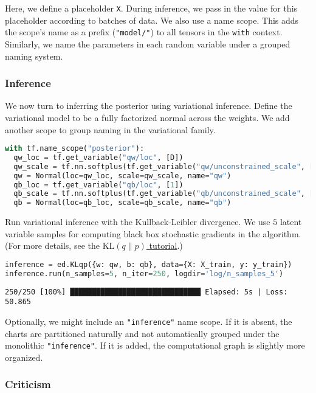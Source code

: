 Here, we define a placeholder \texttt{X}. During inference, we pass in
the value for this placeholder according to batches of data.  We also
use a name scope. This adds the scope's name as a prefix
(\texttt{"model/"}) to all tensors in the \texttt{with} context.
Similarly, we name the parameters in each random variable under a
grouped naming system.

\subsubsection{Inference}

We now turn to inferring the posterior using variational inference.
Define the variational model to be a fully factorized normal across
the weights. We add another scope to group naming in the variational
family.

\begin{lstlisting}[language=Python]
with tf.name_scope("posterior"):
  qw_loc = tf.get_variable("qw/loc", [D])
  qw_scale = tf.nn.softplus(tf.get_variable("qw/unconstrained_scale", [D]))
  qw = Normal(loc=qw_loc, scale=qw_scale, name="qw")
  qb_loc = tf.get_variable("qb/loc", [1])
  qb_scale = tf.nn.softplus(tf.get_variable("qb/unconstrained_scale", [1]))
  qb = Normal(loc=qb_loc, scale=qb_scale, name="qb")
\end{lstlisting}

Run variational inference with the Kullback-Leibler divergence.
We use $5$ latent variable samples for computing
black box stochastic gradients in the algorithm.
(For more details, see the
\href{/tutorials/klqp}{$\text{KL}(q\|p)$ tutorial}.)

\begin{lstlisting}[language=Python]
inference = ed.KLqp({w: qw, b: qb}, data={X: X_train, y: y_train})
inference.run(n_samples=5, n_iter=250, logdir='log/n_samples_5')
\end{lstlisting}

\begin{lstlisting}
250/250 [100%] ██████████████████████████████ Elapsed: 5s | Loss: 50.865
\end{lstlisting}

Optionally, we might include an \texttt{"inference"} name scope.
If it is absent, the charts are partitioned naturally
and not automatically grouped under the monolithic \texttt{"inference"}.
If it is added, the computational graph is slightly more organized.

\subsubsection{Criticism}

